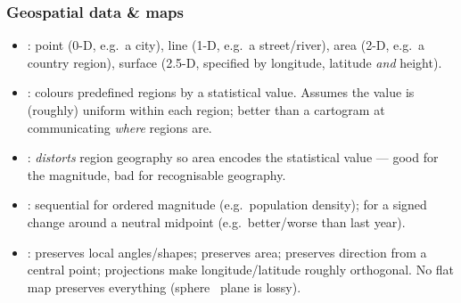 \begin{center}
\end{center}

\subsubsection{Geospatial data \& maps}
\begin{keybox}
\begin{itemize}
  \item {}: point (0-D, e.g.\ a city), line (1-D,
        e.g.\ a street/river), area (2-D, e.g.\ a country region), surface (2.5-D,
        specified by longitude, latitude \emph{and} height).
  \item {}: colours predefined regions by a statistical
        value. Assumes the value is (roughly) uniform within each region; better
        than a cartogram at communicating \emph{where} regions are.
  \item {}: \emph{distorts} region geography so area encodes the
        statistical value --- good for the magnitude, bad for recognisable
        geography.
  \item {}: sequential for ordered magnitude (e.g.\
        population density);  for a signed change around a
        neutral midpoint (e.g.\ better/worse than last year).
  \item {}:  preserves local angles/shapes;
        \term{equal-area} preserves area; \term{azimuthal} preserves direction
        from a central point; \term{conic} projections make longitude/latitude
        roughly orthogonal. No flat map preserves everything (sphere
        \textrightarrow\ plane is lossy).
\end{itemize}
\end{keybox}

